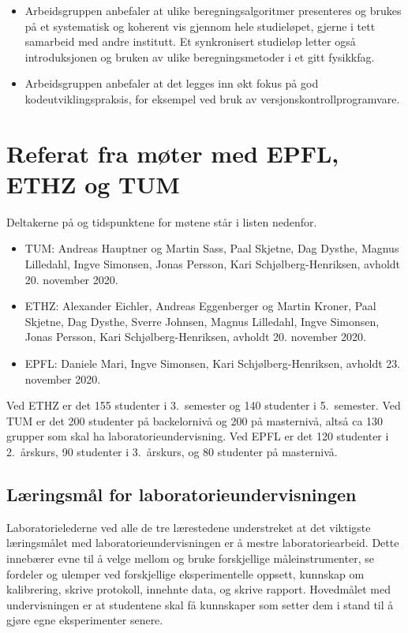 \documentclass{article}
\begin{document}
\begin{itemize}
\begin{itemize}
    \end{itemize}
  \item Arbeidsgruppen anbefaler at ulike beregningsalgoritmer presenteres og brukes på et systematisk og koherent vis gjennom hele studieløpet, gjerne i tett samarbeid med andre institutt. Et synkronisert studieløp letter også introduksjonen og bruken av ulike beregningsmetoder i et gitt fysikkfag.
  \item Arbeidsgruppen anbefaler at det legges inn økt fokus på god kodeutviklingspraksis, for eksempel ved bruk av versjonskontrollprogramvare.

\end{itemize}

\appendix
\section{Referat fra møter med EPFL, ETHZ og TUM}
\label{Referat}
Deltakerne på og tidspunktene for møtene står i listen nedenfor.
\begin{itemize}
  \item TUM: Andreas Hauptner og Martin Sass, Paal Skjetne, Dag Dysthe, Magnus Lilledahl, Ingve Simonsen, Jonas Persson, Kari Schjølberg-Henriksen, avholdt 20. november 2020.
  \item ETHZ: Alexander Eichler, Andreas Eggenberger og Martin Kroner, Paal Skjetne, Dag Dysthe, Sverre Johnsen, Magnus Lilledahl, Ingve Simonsen, Jonas Persson, Kari Schjølberg-Henriksen, avholdt 20. november 2020.
  \item EPFL: Daniele Mari, Ingve Simonsen, Kari Schjølberg-Henriksen, avholdt 23. november 2020.
\end{itemize}

Ved ETHZ er det 155 studenter i 3.~semester og 140 studenter i 5.~semester. Ved TUM er det 200 studenter på backelornivå og 200 på masternivå, altså ca 130 grupper som skal ha laboratorieundervisning. Ved EPFL er det 120 studenter i 2.~årskurs, 90 studenter i 3.~årskurs, og 80 studenter på masternivå.

\subsection{Læringsmål for laboratorieundervisningen}
Laboratorielederne ved alle de tre lærestedene understreket at det viktigste læringsmålet med laboratorieundervisningen er å mestre laboratoriearbeid. Dette innebærer evne til å velge mellom og bruke forskjellige måleinstrumenter, se fordeler og ulemper ved forskjellige eksperimentelle oppsett, kunnskap om kalibrering, skrive protokoll, innehnte data, og skrive rapport. Hovedmålet med undervisningen er at studentene skal få kunnskaper som setter dem i stand til å gjøre egne eksperimenter senere.
\end{document}
